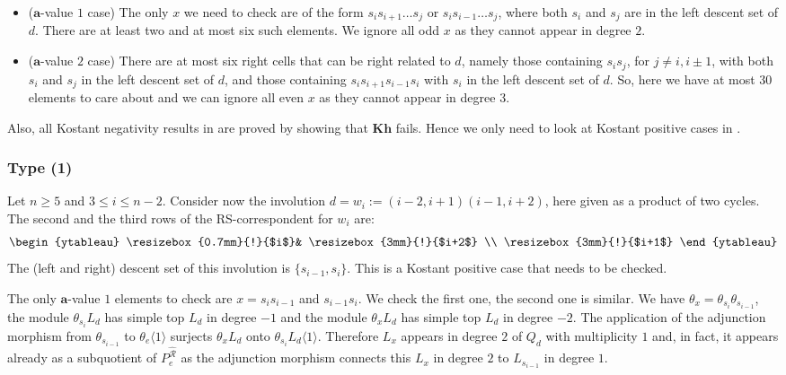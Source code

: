 \documentclass[a4paper]{amsart}
\begin{document}
\begin{itemize}
\item ($\mathbf{a}$-value $1$ case)
The only $x$ we need to check
are of the form $s_is_{i+1}\dots s_j$ or $s_is_{i-1}\dots s_j$,
where both $s_i$ and $s_j$ are in the left descent set of $d$.
There are at least two and at most six such elements.
We ignore all odd $x$ as they cannot appear in degree $2$.
\item($\mathbf{a}$-value $2$ case)
There are at most six
right cells that can be right related to $d$, namely those
containing $s_is_j$, for $j\neq i,i\pm 1$, with both
$s_i$ and $s_j$ in the left descent set of $d$, and those
containing $s_is_{i+1}s_{i-1}s_i$ with $s_i$ 
in the left descent set of $d$. So, here we have at most $30$
elements to care about and we can ignore all even 
$x$ as they cannot appear in degree $3$.
\end{itemize}

Also, all Kostant negativity results in \cite{CM2} are proved by showing
that $\mathbf{Kh}$ fails. Hence we only need to look at Kostant positive cases
in \cite{CM2}.


\subsubsection{Type (1)}\label{s6.2.1}

Let $n\geq 5$ and $3\leq i\leq n-2$. Consider now the involution
$d=w_i:=(i-2,i+1)(i-1,i+2)$, here given as a product of two cycles.
The second and the third rows of the RS-correspondent for $w_i$
are:
\begin{displaymath}
\begin{ytableau}
\resizebox{0.7mm}{!}{$i$}&
\resizebox{3mm}{!}{$i+2$}
\\
\resizebox{3mm}{!}{$i+1$} 
\end{ytableau}
\end{displaymath}
The (left and right) descent set of this involution is
$\{s_{i-1},s_i\}$. This is a Kostant positive case that needs to be checked.

The only $\mathbf{a}$-value $1$ elements to check are
$x=s_{i}s_{i-1}$ and $s_{i-1}s_{i}$. We check the first
one, the second one is similar. We have
$\theta_x=\theta_{s_i}\theta_{s_{i-1}}$, the module
$\theta_{s_i}L_d$ has simple top $L_d$ in degree $-1$
and the module $\theta_{x}L_d$ has simple top $L_d$ in degree $-2$.
The application of the adjunction morphism from $\theta_{s_{i-1}}$
to $\theta_e\langle 1\rangle$ surjects $\theta_{x}L_d$ onto
$\theta_{s_i}L_d\langle 1\rangle$. Therefore $L_{x}$ appears in degree
$2$ of $Q_d$ with multiplicity $1$ and, in fact, it appears already 
as a subquotient of $P_e^{\hat{\mathcal{R}}}$ as the adjunction
morphism connects this $L_{x}$ in degree $2$ 
to $L_{s_{i-1}}$ in degree $1$.
\end{document}
